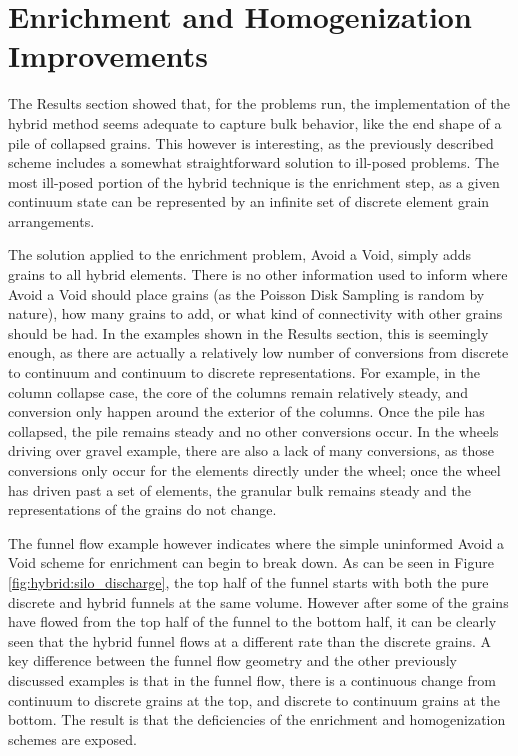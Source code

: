 \newcommand\mystrut{\rule[-0.9cm]{0pt}{2cm}}


\chapter{Enrichment and Homogenization Improvements}
The Results section showed that, for the problems run, the implementation of the hybrid method seems adequate to capture bulk behavior, like the end shape of a pile of collapsed grains. This however is interesting, as the previously described scheme includes a somewhat straightforward solution to ill-posed problems. The most ill-posed portion of the hybrid technique is the enrichment step, as a given continuum state can be represented by an infinite set of discrete element grain arrangements.

The solution applied to the enrichment problem, Avoid a Void, simply adds grains to all hybrid elements. There is no other information used to inform where Avoid a Void should place grains (as the Poisson Disk Sampling is random by nature), how many grains to add, or what kind of connectivity with other grains should be had. In the examples shown in the Results section, this is seemingly enough, as there are actually a relatively low number of conversions from discrete to continuum and continuum to discrete representations. For example, in the column collapse case, the core of the columns remain relatively steady, and conversion only happen around the exterior of the columns. Once the pile has collapsed, the pile remains steady and no other conversions occur. In the wheels driving over gravel example, there are also a lack of many conversions, as those conversions only occur for the elements directly under the wheel; once the wheel has driven past a set of elements, the granular bulk remains steady and the representations of the grains do not change.

The funnel flow example however indicates where the simple uninformed Avoid a Void scheme for enrichment can begin to break down. As can be seen in Figure \ref{fig:hybrid:silo_discharge}, the top half of the funnel starts with both the pure discrete and hybrid funnels at the same volume. However after some of the grains have flowed from the top half of the funnel to the bottom half, it can be clearly seen that the hybrid funnel flows at a different rate than the discrete grains. A key difference between the funnel flow geometry and the other previously discussed examples is that in the funnel flow, there is a continuous change from continuum to discrete grains at the top, and discrete to continuum grains at the bottom. The result is that the deficiencies of the enrichment and homogenization schemes are exposed. 

